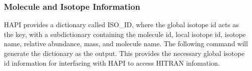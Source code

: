\documentclass[letterpaper,10pt,english]{sphinxmanual}
\begin{document}
\subsubsection{Molecule and Isotope Information}
\label{\detokenize{Generating Parameter Line lists:molecule-and-isotope-information}}
\sphinxAtStartPar
HAPI provides a dictionary called ISO\_ID, where the global isotope id acts as the key, with a sub\sphinxhyphen{}dictionary containing the molecule id, local isotope id, isotope name, relative abundance, mass, and molecule name.  The following command will generate the dictionary as the output.  This provides the necessary global isotope id information for interfacing with HAPI to access HITRAN infomation.

\begin{sphinxVerbatim}[commandchars=\\\{\}]
\end{sphinxVerbatim}
\end{document}
